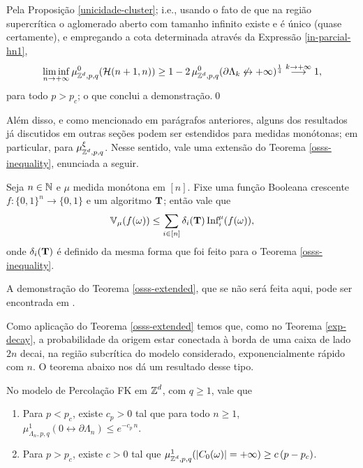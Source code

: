 Pela Proposição \ref{unicidade-cluster}; i.e., usando o fato de que na região supercrítica o aglomerado aberto com tamanho infinito existe e é único (quase certamente), e empregando a cota determinada através da Expressão \eqref{in-parcial-hn1},
\begin{align*}
\liminf_{n\rightarrow+\infty}\mu_{\operatorname{\mathbb{Z}}^d, p, q}^0(\operatorname{\mathcal{H}}(n + 1, n)) \geq 1 - 2\,\mu_{\operatorname{\mathbb{Z}}^d, p, q}^0(\partial\Lambda_k \not\leftrightarrow +\infty)^{\frac{1}{4}} \overset{k \rightarrow +\infty}{\longrightarrow} 1,
\end{align*}
para todo $p > p_c$; o que conclui a demonstração.\hspace{\fill}\qed

Além disso, e como mencionado em parágrafos anteriores, alguns dos resultados já discutidos em outras seções podem ser estendidos para medidas monótonas; em particular, para $\mu_{\operatorname{\mathbb{Z}}^d, p, q}^{\xi}$. Nesse sentido, vale uma extensão do Teorema \ref{osss-inequality}, enunciada a seguir.

\begin{mythm} \label{osss-extended}
	Seja $n \in \operatorname{\mathbb{N}}$ e $\mu$ medida monótona em $[n]$. Fixe uma função Booleana crescente $f: \{0, 1\}^n \longrightarrow \{0, 1\}$ e um algoritmo $\text{\textbf{T}}$; então vale que
	\begin{align*}
		\operatorname{\mathbb{V}}_{\mu}(f(\omega)) \leq \sum_{i \in [n]}\delta_i(\text{\textbf{T}}) \, \text{Inf}_i^{\mu}(f(\omega)),
	\end{align*}
	onde $\delta_i(\text{\textbf{T}})$ é definido da mesma forma que foi feito para o Teorema \ref{osss-inequality}.
\end{mythm}

\par A demonstração do Teorema \ref{osss-extended}, que se não será feita aqui, pode ser encontrada em \cite{duminil2019sharpdecisiontree}. 

Como aplicação do Teorema \ref{osss-extended} temos que, como no Teorema \ref{exp-decay}, a probabilidade da origem estar conectada à borda de uma caixa de lado $2n$ decai, na região subcrítica do modelo considerado, exponencialmente rápido com $n$. O teorema abaixo nos dá um resultado desse tipo.

\begin{mythm} \label{exp-decay-extended}
	No modelo de Percolação FK em $\operatorname{\mathbb{Z}}^d$, com $q \geq 1$, vale que
	\begin{enumerate}
		\item Para $p < p_c$, existe $c_p > 0$ tal que para todo $n \geq 1$, $\mu_{\Lambda_n, p, q}^{1}(0 \leftrightarrow \partial\Lambda_n) \leq e^{-c_p \, n}$.
		\item Para $p > p_c$, existe $c > 0$ tal que $\mu_{\operatorname{\mathbb{Z}}^d, p, q}^{1}(|C_0(\omega)| = +\infty) \geq c \, (p - p_c)$.
	\end{enumerate}
\end{mythm}

